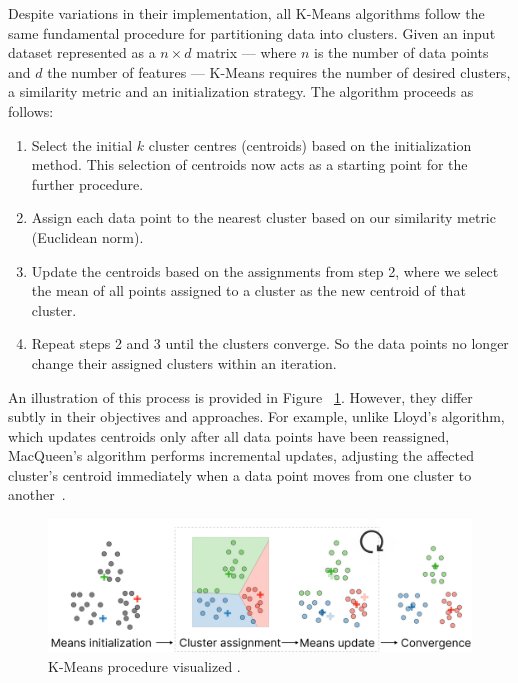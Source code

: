 \documentclass[10pt,twocolumn,letterpaper]{article}
\begin{document}
Despite variations in their implementation, all K-Means algorithms follow the
same fundamental procedure for partitioning data into clusters. Given an input
dataset represented as a $n \times d$ matrix — where $n$ is the number of data
points and $d$ the number of features — K-Means requires the number of desired
clusters, a similarity metric and an initialization strategy. The algorithm
proceeds as follows:
\begin{enumerate}
    \item Select the initial $k$ cluster centres (centroids) based on the initialization
          method. This selection of centroids now acts as a starting point for the
          further procedure.
    \item Assign each data point to the nearest cluster based on our similarity metric
          (\eg Euclidean norm).
    \item Update the centroids based on the assignments from step 2, where we select the
          mean of all points assigned to a cluster as the new centroid of that cluster.
    \item Repeat steps 2 and 3 until the clusters converge. So the data points no longer
          change their assigned clusters within an iteration.
\end{enumerate}
An illustration of this process is provided in Figure
~\ref{fig:kmeans-procedure}. However, they differ subtly in their objectives
and approaches. For example, unlike Lloyd's algorithm, which updates centroids
only after all data points have been reassigned, MacQueen's algorithm performs
incremental updates, adjusting the affected cluster’s centroid immediately when
a data point moves from one cluster to another~\cite{Morissette2013}.

\begin{figure}[b]
    \begin{center}
        \includegraphics[width=0.9\linewidth]{figures/K-Means procedure}
    \end{center}
    \caption{K-Means procedure visualized \cite{Amidi2018}.}
    \label{fig:kmeans-procedure}
\end{figure}
\end{document}
